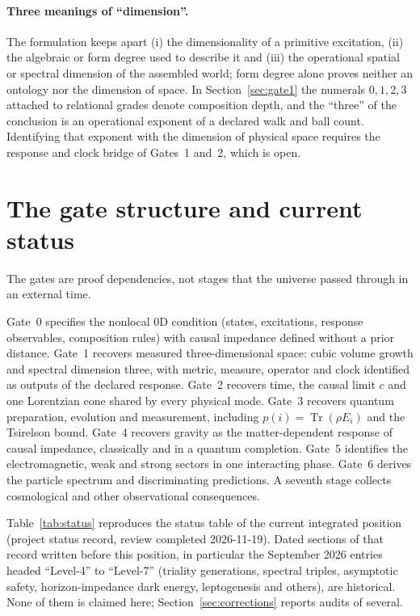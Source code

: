 \documentclass[11pt]{article}
\theoremstyle{definition}
\theoremstyle{remark}
\begin{document}
\paragraph{Three meanings of ``dimension''.} The formulation keeps apart (i) the
dimensionality of a primitive excitation, (ii) the algebraic or form degree used to
describe it and (iii) the operational spatial or spectral dimension of the assembled
world; form degree alone proves neither an ontology nor the dimension of space. In
Section~\ref{sec:gate1}
the numerals $0,1,2,3$ attached to relational grades denote composition depth, and the
``three'' of the conclusion is an operational exponent of a declared walk and ball count.
Identifying that exponent with the dimension of physical space requires the response and
clock bridge of Gates~1 and~2, which is open.

\section{The gate structure and current status}
\label{sec:gates}

The gates are proof dependencies, not stages that the universe passed through in an
external time.

Gate~0 specifies the nonlocal 0D condition (states, excitations, response observables,
composition rules) with causal impedance defined without a prior distance. Gate~1
recovers measured three-dimensional space: cubic volume growth and spectral dimension
three, with metric, measure, operator and clock identified as outputs of the declared
response. Gate~2 recovers time, the causal limit $c$ and one Lorentzian cone shared by
every physical mode. Gate~3 recovers quantum preparation, evolution and measurement,
including $p(i)=\operatorname{Tr}(\rho E_i)$ and the Tsirelson bound. Gate~4 recovers
gravity as the matter-dependent response of causal impedance, classically and in a
quantum completion. Gate~5 identifies the electromagnetic, weak and strong sectors in one
interacting phase. Gate~6 derives the particle spectrum and discriminating predictions.
A seventh stage collects cosmological and other observational consequences.

Table~\ref{tab:status} reproduces the status table of the current integrated position
(project status record, review completed 2026-11-19). Dated sections of that record
written before this position, in particular the September 2026 entries headed
``Level-4'' to ``Level-7'' (triality generations, spectral triples, asymptotic safety,
horizon-impedance dark energy, leptogenesis and others), are historical. None of them is
claimed here; Section~\ref{sec:corrections} reports audits of several.
\end{document}
